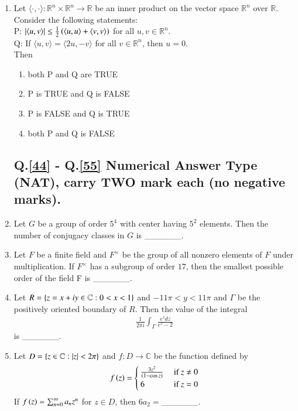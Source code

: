\documentclass[journal]{IEEEtran}
\begin{document}
\begin{enumerate}
    \item Let $\langle \cdot, \cdot \rangle : \mathbb{R}^n \times \mathbb{R}^n \rightarrow \mathbb{R}$ be an inner product on the vector space $\mathbb{R}^n$ over $\mathbb{R}$. Consider the following statements:\\ P: $\left\vert\langle u,v \rangle\right\vert \leq \frac{1}{2}\left(\langle u,u \rangle + \langle v,v \rangle\right)$ for all $u,v \in \mathbb{R}^n$.\\Q: If $\langle u,v \rangle = \langle 2u,-v \rangle$ for all $v \in \mathbb{R}^n$, then $u=0$.\\Then
        \begin{enumerate}
            \item both P and Q are TRUE
            \item P is TRUE and Q is FALSE
            \item P is FALSE and Q is TRUE
            \item both P and Q is FALSE
        \end{enumerate}

    \subsection*{Q.\ref{44} - Q.\ref{55} Numerical Answer Type (NAT), carry TWO mark each (no negative marks).}
    \item \label{44} Let $G$ be a group of order $5^4$ with center having $5^2$ elements. Then the number of conjugacy classes in $G$ is \_\_\_\_\_\_.
    \item Let $F$ be a finite field and $F^{\times}$ be the group of all nonzero elements of $F$ under multiplication. If $F^{\times}$ has a subgroup of order $17$, then the smallest possible order of the field F is \_\_\_\_\_\_.
    \item Let $R = \left\{z = x + iy \in \mathbb{C} : 0< x<1\right\}$ and $-11 \pi < y < 11 \pi$ and $\Gamma$ be the positively oriented boundary of $R$. Then the value of the integral
        \begin{align*}
            \frac{1}{2 \pi i} \int_{\Gamma} \frac{e^z dz}{e^z - 2}
        \end{align*}
        is \_\_\_\_\_\_.

    \item Let $D = \left\{z \in \mathbb{C} : \left\vert z\right\vert < 2 \pi\right\}$ and $f : D \rightarrow \mathbb{C}$ be the function defined by
        \begin{align*}
            f\left(z\right) = 
            \begin{cases}
                \frac{3 z^2}{\left(1 - \cos z\right)} &\text{ if } z \neq 0 \\
                6 &\text{ if } z = 0
            \end{cases}
        \end{align*}
        If $f\left(z\right) = \sum_{n=0}^{\infty} a_n z^n$ for $z \in D$, then $6a_2=$\_\_\_\_\_\_.


\end{enumerate}
\end{document}
